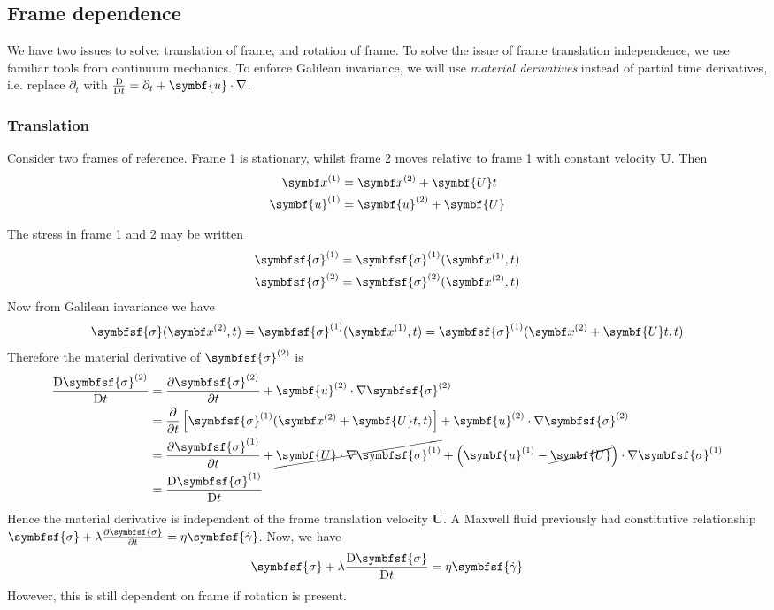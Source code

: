 \documentclass{jknotes}
\begin{document}
\subsection{Frame dependence}
We have two issues to solve: translation of frame, and rotation of frame. To
solve the issue of frame translation independence, we use familiar tools from
continuum mechanics. To enforce Galilean invariance, we will use
\emph{material derivatives} instead of partial time derivatives, i.e. replace
$\partial_t$ with $\frac{\diffD}{\diffD t} = \partial_t +
\symbf{u}\cdot\nabla$.

\subsubsection{Translation}

Consider two frames of reference. Frame 1 is stationary, whilst frame 2 moves
relative to frame 1 with constant velocity $\symbf{U}$. Then
\begin{align}
	\x^{(1)} &= \x^{(2)} + \symbf{U}t \\
	\symbf{u}^{(1)} &= \symbf{u}^{(2)} + \symbf{U}
\end{align}

The stress in frame 1 and 2 may be written
\begin{align}
	\symbfsf{\sigma}^{(1)} &= \symbfsf{\sigma}^{(1)}(\x^{(1)},t) \\
	\symbfsf{\sigma}^{(2)} &= \symbfsf{\sigma}^{(2)}(\x^{(2)},t)
\end{align}
Now from Galilean invariance we have
\begin{equation}
	\symbfsf{\sigma}(\x^{(2)},t) = \symbfsf{\sigma}^{(1)}(\x^{(1)},t) =
	\symbfsf{\sigma}^{(1)}(\x^{(2)}+\symbf{U}t,t)
\end{equation}
Therefore the material derivative of $\symbfsf{\sigma}^{(2)}$ is
\begin{align}
	\frac{\diffD \symbfsf{\sigma}^{(2)}}{\diffD t} &= \frac{\partial
	\symbfsf{\sigma}^{(2)}}{\partial t} + \symbf{u}^{(2)}\cdot \nabla
	\symbfsf{\sigma}^{(2)} \\
	&= \frac{\partial}{\partial t} \left[ \symbfsf{\sigma}^{(1)}(\x^{(2)} +
\symbf{U}t,t)\right] + \symbf{u}^{(2)}\cdot\nabla \symbfsf{\sigma}^{(2)} \\
&= \frac{\partial\symbfsf{\sigma}^{(1)}}{\partial t} +
\cancel{\symbf{U}\cdot\nabla\symbfsf{\sigma}^{(1)}} +
\left(\symbf{u}^{(1)}-\cancel{\symbf{U}}\right)\cdot\nabla\symbfsf{\sigma}^{(1)}
\\
&= \frac{\diffD \symbfsf{\sigma}^{(1)}}{\diffD t}
\end{align}
Hence the material derivative is independent of the frame translation velocity
$\symbf{U}$. A Maxwell fluid previously had constitutive relationship
$\symbfsf{\sigma} +\lambda \frac{\partial \symbfsf{\sigma}}{\partial t} = \eta
\symbfsf{\srate}$. Now, we have
\begin{equation}
	\symbfsf{\sigma} + \lambda \frac{\diffD \symbfsf{\sigma}}{\diffD t} = \eta
	\symbfsf{\srate}
\end{equation}
However, this is still dependent on frame if rotation is present.
\end{document}
